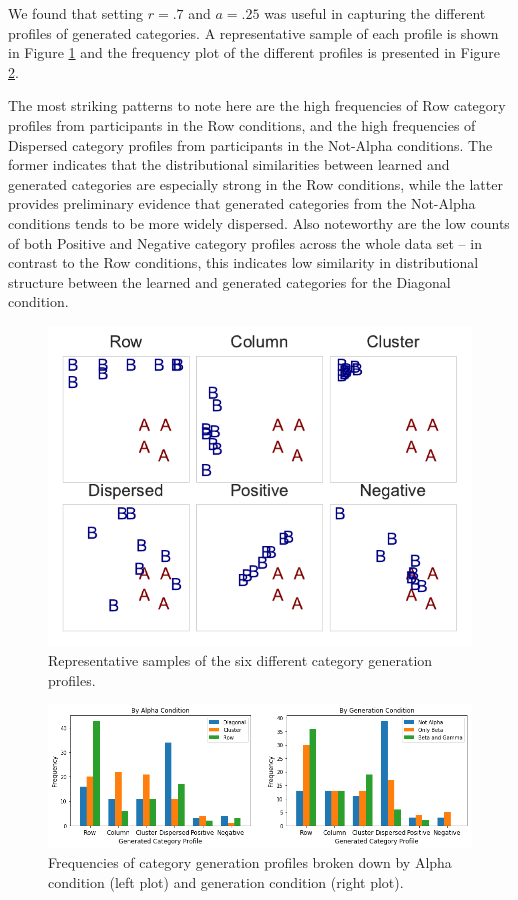 \documentclass[10pt,letterpaper]{article}
\begin{document}
We found that setting $r = .7$ and $a = .25$ was useful in capturing the different profiles of generated categories. A representative sample of each profile is shown in Figure
\ref{fig:samples} and the frequency plot of the different profiles is presented
in Figure \ref{fig:profile}.

The most striking patterns to note here are the high frequencies of Row category profiles from participants in the Row conditions, and the high frequencies of Dispersed category profiles from participants in the Not-Alpha conditions. The former indicates that the distributional similarities between learned and generated categories are especially strong in the Row conditions, while the latter provides preliminary evidence that generated categories from the Not-Alpha conditions tends to be more widely dispersed. Also noteworthy are the low counts of both Positive and Negative category profiles across the whole data set -- in contrast to the Row conditions, this indicates low similarity in distributional structure between the learned and generated categories for the Diagonal condition.


\begin{figure}[H]
\begin{center}
    \includegraphics[width=.5\textwidth]{Figures/samples.pdf}
\end{center}
\caption{Representative samples of the six different category generation profiles.} 
\label{fig:samples}
\end{figure}

\begin{figure}%
\begin{center}
    \includegraphics[width=\textwidth]{Figures/profile_freq.png}
\end{center}
\caption{Frequencies of category generation profiles broken down by Alpha condition (left plot) and generation condition (right plot).}
\label{fig:profile}
\end{figure}
\end{document}
